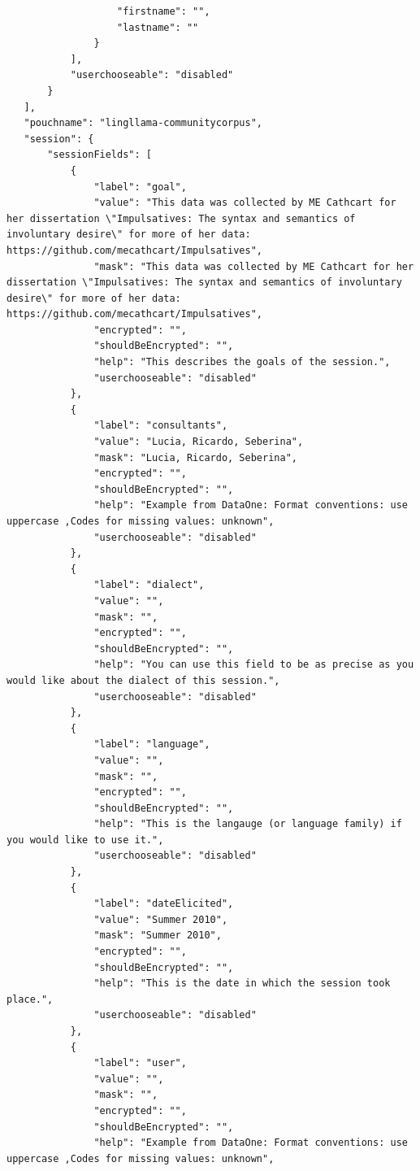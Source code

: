 \documentclass[12pt]{article}
\begin{document}
\begin{verbatim}
                   "firstname": "",
                   "lastname": ""
               }
           ],
           "userchooseable": "disabled"
       }
   ],
   "pouchname": "lingllama-communitycorpus",
   "session": {
       "sessionFields": [
           {
               "label": "goal",
               "value": "This data was collected by ME Cathcart for her dissertation \"Impulsatives: The syntax and semantics of involuntary desire\" for more of her data: https://github.com/mecathcart/Impulsatives",
               "mask": "This data was collected by ME Cathcart for her dissertation \"Impulsatives: The syntax and semantics of involuntary desire\" for more of her data: https://github.com/mecathcart/Impulsatives",
               "encrypted": "",
               "shouldBeEncrypted": "",
               "help": "This describes the goals of the session.",
               "userchooseable": "disabled"
           },
           {
               "label": "consultants",
               "value": "Lucia, Ricardo, Seberina",
               "mask": "Lucia, Ricardo, Seberina",
               "encrypted": "",
               "shouldBeEncrypted": "",
               "help": "Example from DataOne: Format conventions: use uppercase ,Codes for missing values: unknown",
               "userchooseable": "disabled"
           },
           {
               "label": "dialect",
               "value": "",
               "mask": "",
               "encrypted": "",
               "shouldBeEncrypted": "",
               "help": "You can use this field to be as precise as you would like about the dialect of this session.",
               "userchooseable": "disabled"
           },
           {
               "label": "language",
               "value": "",
               "mask": "",
               "encrypted": "",
               "shouldBeEncrypted": "",
               "help": "This is the langauge (or language family) if you would like to use it.",
               "userchooseable": "disabled"
           },
           {
               "label": "dateElicited",
               "value": "Summer 2010",
               "mask": "Summer 2010",
               "encrypted": "",
               "shouldBeEncrypted": "",
               "help": "This is the date in which the session took place.",
               "userchooseable": "disabled"
           },
           {
               "label": "user",
               "value": "",
               "mask": "",
               "encrypted": "",
               "shouldBeEncrypted": "",
               "help": "Example from DataOne: Format conventions: use uppercase ,Codes for missing values: unknown",

\end{verbatim}
\end{document}
